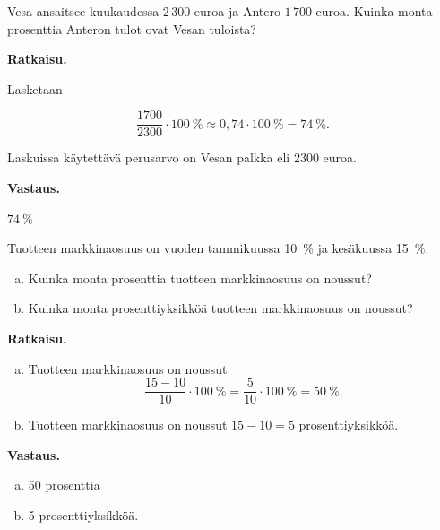 \begin{esimerkki}
Vesa ansaitsee kuukaudessa ${2\,300}$ euroa ja Antero ${1\,700}$ euroa. Kuinka monta prosenttia Anteron tulot ovat Vesan tuloista? 

\textbf{Ratkaisu.}

Lasketaan

\begin{equation*}
\frac{1700}{2300} \cdot 100\ \%  \approx 0,74\cdot 100\ \% = 74 \  \%.
\end{equation*}

Laskuissa käytettävä perusarvo on Vesan palkka eli 2300 euroa.
    
\textbf{Vastaus.}

$74~\%$
\end{esimerkki}





\begin{esimerkki}
    Tuotteen markkinaosuus on vuoden tammikuussa 10~\% ja kesäkuussa 15~\%. 
    \begin{enumerate}[a)]
    \item Kuinka monta prosenttia tuotteen markkinaosuus on noussut?
    
    \item Kuinka monta prosenttiyksikköä tuotteen markkinaosuus on noussut?
    \end{enumerate}
    
    {\bf Ratkaisu.} 
    
    \begin{enumerate}[a)]
    \item Tuotteen markkinaosuus on noussut
    \[
    \frac{15-10}{10} \cdot 100\ \%= \frac{5}{10}\cdot 100\ \% = 50\ \%.
    \]
    
    \item Tuotteen markkinaosuus on noussut $15-10=5$ prosenttiyksikköä. 
    \end{enumerate}
    
    {\bf Vastaus.}
    
    \begin{enumerate}[a)]
    \item 50 prosenttia
    \item 5 prosenttiyksíkköä.
    \end{enumerate}
\end{esimerkki}

